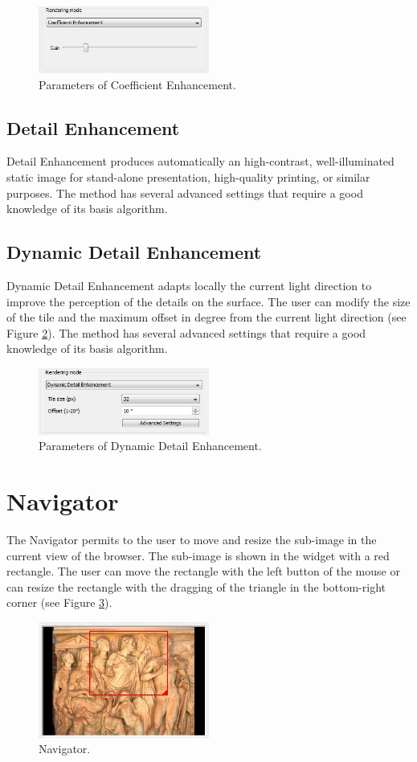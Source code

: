\documentclass[oneside, 11pt]{book}
\begin{document}
\begin{figure}[hbt]
  \centering
  \includegraphics[width=0.5\textwidth]{coeff_enh}
  \caption{Parameters of Coefficient Enhancement.}
  \label{fig:coeffEnh}
\end{figure}

\subsection{Detail Enhancement}
Detail Enhancement produces automatically an high-contrast, well-illuminated static image for stand-alone presentation, high-quality printing, or similar purposes. The method has several advanced settings that require a good knowledge of its basis algorithm. 

\subsection{Dynamic Detail Enhancement}
Dynamic Detail Enhancement adapts locally the current light direction to improve the perception of the details on the surface. The user can modify the size of the tile and the maximum offset in degree from the current light direction (see Figure \ref{fig:dynDetail}). The method has several advanced settings that require a good knowledge of its basis algorithm.

\begin{figure}[hbt]
  \centering
  \includegraphics[width=0.5\textwidth]{dyn_detail_enh}
  \caption{Parameters of Dynamic Detail Enhancement.}
  \label{fig:dynDetail}
\end{figure}


\section{Navigator}
The Navigator permits to the user to move and resize the sub-image in the current view of the browser. The sub-image is shown in the widget with a red rectangle. The user can move the rectangle with the left button of the mouse or can resize the rectangle with the dragging of the triangle in the bottom-right corner (see Figure \ref{fig:navigator}).

\begin{figure}[hbt]
  \centering
  \includegraphics[width=0.5\textwidth]{navigator}
  \caption{Navigator.}
  \label{fig:navigator}
\end{figure}
\end{document}
